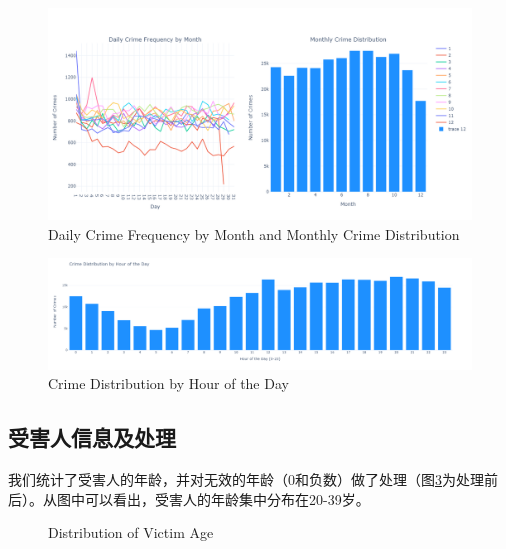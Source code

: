 \documentclass{article}
\begin{document}
\begin{figure}[H]
    \centering
    \includegraphics[width=1\textwidth]{../pic/date.png}
    \caption{Daily Crime Frequency by Month and Monthly Crime Distribution}
    \label{fig:date}
\end{figure}

\begin{figure}[H]
    \centering
    \includegraphics[width=1\textwidth]{../pic/hour.png}
    \caption{Crime Distribution by Hour of the Day}
    \label{fig:hour}
\end{figure}

\subsection{受害人信息及处理}
我们统计了受害人的年龄，并对无效的年龄（0和负数）做了处理（图\ref{fig:age}为处理前后）。从图中可以看出，受害人的年龄集中分布在20-39岁。

\begin{figure}[htbp]
    \centering

    \hspace{0.5cm}

    \caption{Distribution of Victim Age}
    \label{fig:age}
\end{figure}
\end{document}
